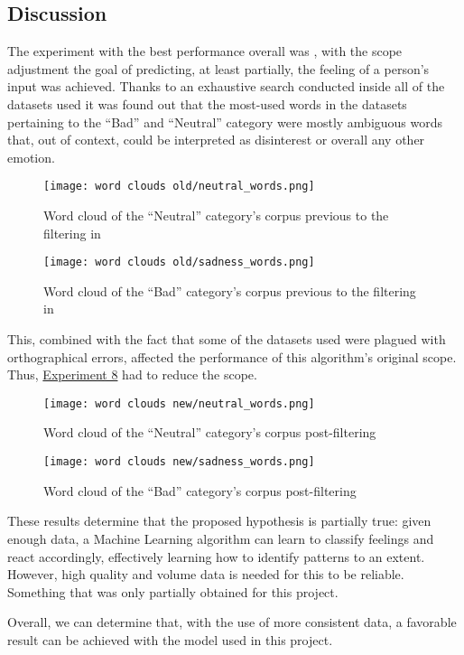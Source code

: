 \subsection{Discussion}
The experiment with the best performance overall was , with the scope adjustment the goal of predicting, at least partially, the feeling of a person's input was achieved. Thanks to an exhaustive search conducted inside all of the datasets used it was found out that the most-used words in the datasets pertaining to the ``Bad'' and ``Neutral'' category were mostly ambiguous words that, out of context, could be interpreted as disinterest or overall any other emotion.
\begin{figure}[!h]
	\centering
	\texttt{[image: word clouds old/neutral\_words.png]}
	\caption[Word cloud of the ``Neutral'' category's corpus previous to the filtering.]{Word cloud of the ``Neutral'' category's corpus previous to the filtering in }
	\label{fig:neutralwords_pre}
	\vspace{1cm}
	\texttt{[image: word clouds old/sadness\_words.png]}
	\caption[Word cloud of the ``Bad'' category's corpus previous to the filtering]{Word cloud of the ``Bad'' category's corpus previous to the filtering in }
	\label{fig:sadnesswords_pre}
\end{figure}

This, combined with the fact that some of the datasets used were plagued with orthographical errors, affected the performance of this algorithm's original scope. Thus, \hyperref[exp9]{Experiment 8} had to reduce the scope.

\begin{figure}[!h]
	\centering
	\texttt{[image: word clouds new/neutral\_words.png]}
	\caption{Word cloud of the ``Neutral'' category's corpus post-filtering}
	\label{fig:neutralwords_post}
	\vspace{1cm}
	\texttt{[image: word clouds new/sadness\_words.png]}
	\caption{Word cloud of the ``Bad'' category's corpus post-filtering}
	\label{fig:sadnesswords_post}
\end{figure}

These results determine that the proposed hypothesis is partially true: given enough data, a Machine Learning algorithm can learn to classify feelings and react accordingly, effectively learning how to identify patterns to an extent. However, high quality and volume data is needed for this to be reliable. Something that was only partially obtained for this project.

Overall, we can determine that, with the use of more consistent data, a favorable result can be achieved with the model used in this project.